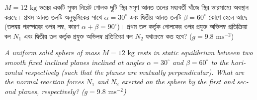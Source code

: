 \documentclass[12pt, a4paper]{article}
\begin{document}
\begin{tcolorbox}[questionbox={প্রশ্ন (Question) 37}]
\noindent
$M = 12\text{ kg}$ ভরের একটি সুষম নিরেট গোলক দুটি স্থির মসৃণ আনত তলের মধ্যবর্তী খাঁজে স্থির ভারসাম্যে অবস্থান করছে। প্রথম আনত তলটি অনুভূমিকের সাথে $\alpha = 30^\circ$ এবং দ্বিতীয় আনত তলটি $\beta = 60^\circ$ কোণে হেলে আছে (তলদ্বয় পরস্পরের ওপর লম্ব, কারণ $\alpha + \beta = 90^\circ$)। প্রথম তল কর্তৃক গোলকের ওপর প্রযুক্ত অভিলম্ব প্রতিক্রিয়া বল $N_1$ এবং দ্বিতীয় তল কর্তৃক প্রযুক্ত অভিলম্ব প্রতিক্রিয়া বল $N_2$ যথাক্রমে কত হবে? ($g = 9.8\text{ ms}^{-2}$)

\vspace{0.8em}
\begin{english}
\noindent\textit{\color{darkgray}
A uniform solid sphere of mass $M = 12\text{ kg}$ rests in static equilibrium between two smooth fixed inclined planes inclined at angles $\alpha = 30^\circ$ and $\beta = 60^\circ$ to the horizontal respectively (such that the planes are mutually perpendicular). What are the normal reaction forces $N_1$ and $N_2$ exerted on the sphere by the first and second planes, respectively? ($g = 9.8\text{ ms}^{-2}$)
}
\end{english}
\end{tcolorbox}
\end{document}
